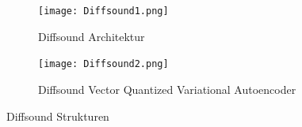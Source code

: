 \documentclass[
  a4paper,  %
  twoside,  %
  bibliography=totoc,
  headsepline,
  cleardoublepage=empty,
  parskip=half,
  draft=false
]{scrbook}
\begin{document}
\begin{figure}[h]
\centering
\begin{subfigure}{1.0\textwidth}
  \centering
  \texttt{[image: Diffsound1.png]}
  \caption[Diffsound Architektur]{Diffsound Architektur}
  \label{fig:DiffsoundArchitecture}
\end{subfigure}

\vspace{1em} %

\begin{subfigure}{1.0\textwidth}
  \centering
  \texttt{[image: Diffsound2.png]}
  \caption[Diffsound VQ-VAE]{Diffsound Vector Quantized Variational Autoencoder}
  \label{fig:VQVAE}
\end{subfigure}
\caption{Diffsound Strukturen \cite{yang_diffsound_2023}}
\label{fig:test}
\end{figure}
\end{document}

